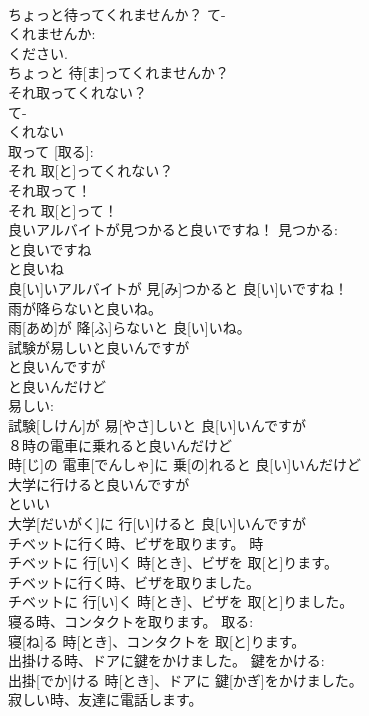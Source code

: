\documentclass[8pt]{extreport}
\begin{document}
\begin{CJK}{UTF8}{min}
\\	ちょっと待ってくれませんか？	て-
\\	くれませんか: 
\\	ください. 
\\	ちょっと 待[ま]ってくれませんか？	
\\	それ取ってくれない？	
\\	て-
\\	くれない 
\\	取って [取る]: 
\\	それ 取[と]ってくれない？	
\\	それ取って！	
\\	それ 取[と]って！	
\\	良いアルバイトが見つかると良いですね！	見つかる: 
\\	と良いですね 
\\	と良いね 
\\	良[い]いアルバイトが 見[み]つかると 良[い]いですね！	
\\	雨が降らないと良いね。	
\\	雨[あめ]が 降[ふ]らないと 良[い]いね。	
\\	試験が易しいと良いんですが
\\	と良いんですが 
\\	と良いんだけど 
\\	易しい: 
\\	試験[しけん]が 易[やさ]しいと 良[い]いんですが
\\	８時の電車に乗れると良いんだけど
\\	時[じ]の 電車[でんしゃ]に 乗[の]れると 良[い]いんだけど
\\	大学に行けると良いんですが
\\	といい 
\\	大学[だいがく]に 行[い]けると 良[い]いんですが
\\	チベットに行く時、ビザを取ります。	時 
\\	チベットに 行[い]く 時[とき]、ビザを 取[と]ります。	
\\	チベットに行く時、ビザを取りました。	
\\	チベットに 行[い]く 時[とき]、ビザを 取[と]りました。	
\\	寝る時、コンタクトを取ります。	取る: 
\\	寝[ね]る 時[とき]、コンタクトを 取[と]ります。	
\\	出掛ける時、ドアに鍵をかけました。	鍵をかける: 
\\	出掛[でか]ける 時[とき]、ドアに 鍵[かぎ]をかけました。	
\\	寂しい時、友達に電話します。	

\end{CJK}
\end{document}
